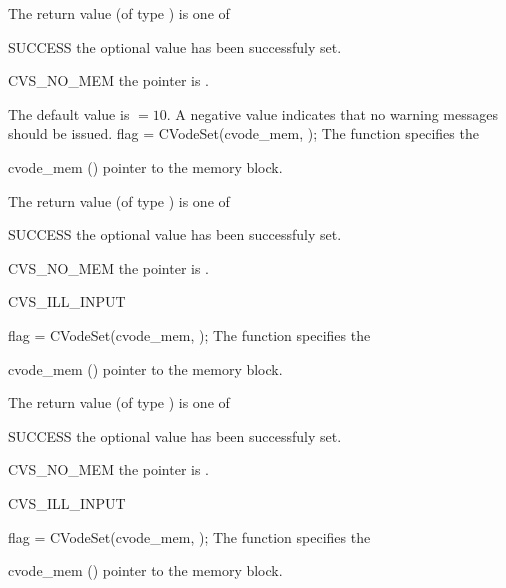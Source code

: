 {
  The return value  (of type ) is one of
  \begin{args}
  \item[SUCCESS] 
    the optional value has been successfuly set.
  \item[CVS\_NO\_MEM]
    the  pointer is .
  \end{args}
}
{
  The default value is $= 10$.
  A negative  value indicates that no warning messages should
  be issued.
}
{
flag = CVodeSet(cvode\_mem, );
}
{
  The function  specifies the
}
{
  \begin{args}
  \item[cvode\_mem] ()
    pointer to the {\cvodes} memory block.
  \item[]
    
  \end{args}
}
{
  The return value  (of type ) is one of
  \begin{args}
  \item[SUCCESS] 
    the optional value has been successfuly set.
  \item[CVS\_NO\_MEM]
    the  pointer is .
  \item[CVS\_ILL\_INPUT]
    
  \end{args}
}
{}
{
flag = CVodeSet(cvode\_mem, );
}
{
  The function  specifies the
}
{
  \begin{args}
  \item[cvode\_mem] ()
    pointer to the {\cvodes} memory block.
  \item[]
    
  \end{args}
}
{
  The return value  (of type ) is one of
  \begin{args}
  \item[SUCCESS] 
    the optional value has been successfuly set.
  \item[CVS\_NO\_MEM]
    the  pointer is .
  \item[CVS\_ILL\_INPUT]
    
  \end{args}
}
{}
{
flag = CVodeSet(cvode\_mem, );
}
{
  The function  specifies the
}
{
  \begin{args}
  \item[cvode\_mem] ()
    pointer to the {\cvodes} memory block.
  \item[]
    
  \end{args}
}
